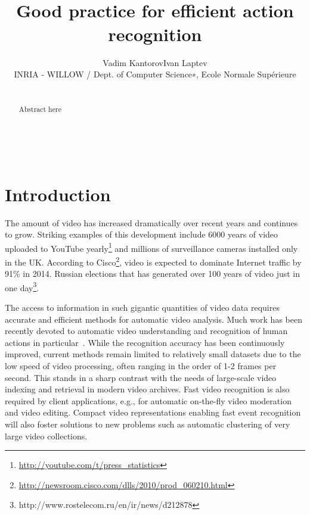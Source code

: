 \documentclass[10pt,twocolumn,letterpaper]{article}
\begin{document}
\title{\mbox{}\vspace{-1cm}\\Good practice for efficient action
recognition\vspace{-.2cm}\\}

\author{Vadim Kantorov\qquad Ivan Laptev\\INRIA - WILLOW / Dept.
of Computer Science∗, Ecole Normale Supérieure}

\maketitle

\begin{abstract}
\mbox{}\vspace{-.6cm}\\
Abstract here
\end{abstract}

\mbox{}\vspace{-1.3cm}\\


\section{Introduction}

The amount of video has increased dramatically over recent years
and continues to grow. Striking examples of this development
include 6000 years of video uploaded to YouTube
yearly\footnote{\scriptsize
\url{http://youtube.com/t/press\_statistics}} and millions of
surveillance cameras installed only in the UK. According to
Cisco\footnote{\scriptsize
\url{http://newsroom.cisco.com/dlls/2010/prod_060210.html}},
video is expected to dominate Internet traffic by 91\% in 2014.
Russian elections that has generated over 100 years of video
just in one
day\footnote{http://www.rostelecom.ru/en/ir/news/d212878}.

The access to information in such gigantic quantities of video
data requires accurate and efficient methods for automatic video
analysis. Much work has been recently devoted to automatic video
understanding and recognition of human actions in
particular~\cite{Laptev08,Liu11,Niebles10,Sadanand12,Schuldt04,Wang12}.
While the recognition accuracy has been continuously improved,
current methods remain limited to relatively small datasets due
to the low speed of video processing, often ranging in the order
of 1-2 frames per second. This stands in a sharp contrast with
the needs of large-scale video indexing and retrieval in modern
video archives. Fast video recognition is also required by
client applications, e.g., for automatic on-the-fly video
moderation and video editing. Compact video representations
enabling fast event recognition will also foster solutions to
new problems such as automatic clustering of very large video
collections.
\end{document}

